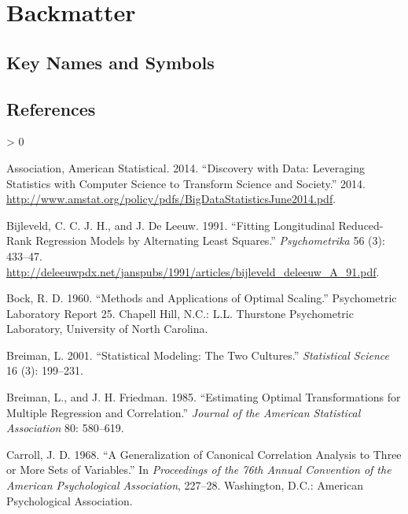 \documentclass[
  12pt,
]{book}
\newlength{\cslhangindent}
\newenvironment{CSLReferences}[2] %
 {%
  \setlength{\parindent}{0pt}
  \ifodd #1 \everypar{\setlength{\hangindent}{\cslhangindent}}\ignorespaces\fi
  \ifnum #2 > 0
  \setlength{\parskip}{#2\baselineskip}
  \fi
 }%
 {}
\begin{document}
\hypertarget{backmatter}{%
\chapter{Backmatter}\label{backmatter}}

\hypertarget{key-names-and-symbols}{%
\section{Key Names and Symbols}\label{key-names-and-symbols}}

\hypertarget{references}{%
\section{References}\label{references}}

\hypertarget{refs}{}
\begin{CSLReferences}{1}{0}
\leavevmode\hypertarget{ref-asa_14}{}%
Association, American Statistical. 2014. {``{Discovery with Data: Leveraging Statistics with Computer Science to Transform Science and Society}.''} 2014. \url{http://www.amstat.org/policy/pdfs/BigDataStatisticsJune2014.pdf}.

\leavevmode\hypertarget{ref-bijleveld_deleeuw_A_91}{}%
Bijleveld, C. C. J. H., and J. De Leeuw. 1991. {``{Fitting Longitudinal Reduced-Rank Regression Models by Alternating Least Squares}.''} \emph{Psychometrika} 56 (3): 433--47. \url{http://deleeuwpdx.net/janspubs/1991/articles/bijleveld_deleeuw_A_91.pdf}.

\leavevmode\hypertarget{ref-bock_60}{}%
Bock, R. D. 1960. {``{Methods and Applications of Optimal Scaling}.''} Psychometric Laboratory Report 25. Chapell Hill, N.C.: L.L. Thurstone Psychometric Laboratory, University of North Carolina.

\leavevmode\hypertarget{ref-breiman_01}{}%
Breiman, L. 2001. {``{Statistical Modeling: The Two Cultures}.''} \emph{Statistical Science} 16 (3): 199--231.

\leavevmode\hypertarget{ref-breiman_friedman_85}{}%
Breiman, L., and J. H. Friedman. 1985. {``{Estimating Optimal Transformations for Multiple Regression and Correlation}.''} \emph{Journal of the American Statistical Association} 80: 580--619.

\leavevmode\hypertarget{ref-carroll_68}{}%
Carroll, J. D. 1968. {``{A Generalization of Canonical Correlation Analysis to Three or More Sets of Variables}.''} In \emph{Proceedings of the 76th Annual Convention of the American Psychological Association}, 227--28. Washington, D.C.: American Psychological Association.


\end{CSLReferences}
\end{document}
